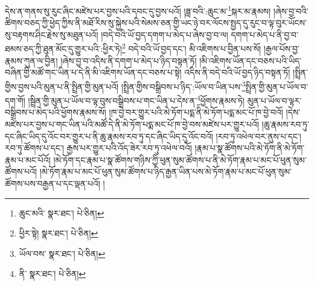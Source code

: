 དེས་ན་གནས་སུ་རུང་ཞིང་མཛེས་པར་བྱས་པའི་དབང་དུ་བྱས་པའོ། །ཟླ་བའི་:ཆུང་མ་\footnote{ཆུང་མའི་  སྣར་ཐང་།  པེ་ཅིན། }སྐར་མ་རྣམས། །ཞེས་བྱ་བའི་ཚིགས་བཅད་ཀྱི་ཕྱེད་ཀྱིས་ནི་མཐོ་རིས་སུ་སྐྱེས་པའི་སེམས་ཅན་གྱི་ཡང་ཉེ་བར་ལོངས་སྤྱད་དུ་རུང་བ་ལྟ་བུར་ཡོངས་སུ་བརྟགས་ཤིང་རྗེས་སུ་མཐུན་པའོ། །བདེ་བའི་ཡོ་བྱད་དགག་པ་མེད་པ་ཞེས་བྱ་བ་ལ། དགག་པ་མེད་པ་ནི་བྱ་བ་ཐམས་ཅད་ཀྱི་ཐུན་མོང་དུ་གྱུར་པའི་:ཕྱིར་ཏེ།\footnote{ཕྱིར་སྟེ།  སྣར་ཐང་།  པེ་ཅིན། } བདེ་བའི་ཡོ་བྱད་དང་། མི་འཇིགས་པ་བྱིན་པས་སོ། །རྒྱལ་པོས་བྱ་རྣམས་ཀུན་ལ་བྱིན། །ཞེས་བྱ་བ་འདིས་ནི་དགག་པ་མེད་པ་ཉིད་བསྟན་ཏོ། །མི་འཇིགས་ཡོན་དང་བཅས་པའི་ཡིད་བཞིན་གྱི་མཚོ་གང་ཡིན་པ་དེ་ནི་མི་འཇིགས་ཡོན་དང་བཅས་པ་སྟེ། འདིས་ནི་བདེ་བའི་ཡོ་བྱད་ཉིད་བསྟན་ཏོ། །སྤྲིན་གྱིས་བྱས་པའི་མུན་པ་ནི་སྤྲིན་གྱི་མུན་པའོ། །སྤྲིན་གྱིས་བསྒྲིབས་པ་ཉིད་:ཡོལ་བ་ཡིན་པས་\footnote{ཡོལ་བས་  སྣར་ཐང་།  པེ་ཅིན། }སྤྲིན་གྱི་མུན་པ་ཡོལ་བ་དག་གོ། །སྦྲིན་གྱི་མུན་པ་ཡོལ་བ་ལྟ་བུས་བསྒྲིབས་པ་གང་ཡིན་པ་དེས་ན་\footnote{ནི་  སྣར་ཐང་།  པེ་ཅིན། }ཕྱོགས་རྣམས་ཏེ། མུན་པ་ཡོལ་བ་ལྟར་བསྒྲིབས་པ་མེད་པའི་ཕྱོགས་རྣམས་སོ། །ཁ་བྱེ་བར་གྱུར་པའི་མེ་ཏོག་པདྨ་ནི་མེ་ཏོག་པདྨ་མང་པོ་ཁ་བྱེ་བའོ། །དེས་མཛེས་པར་བྱས་པ་གང་ཡིན་པའི་མཚོ་དེ་ནི་མེ་ཏོག་པདྨ་མང་པོ་ཁ་བྱེ་བས་མཛེས་པར་གྱུར་པའོ། །ཆུ་རྣམས་རབ་ཏུ་དང་ཞིང་ཡིད་དུ་འོང་བར་གྱུར་པ་ནི་ཆུ་རྣམས་རབ་ཏུ་དང་ཞིང་ཡིད་དུ་འོང་བའོ། །རབ་ཏུ་འཕེལ་བར་ནུས་པ་དང་། རབ་ཏུ་ཚོགས་པ་དང་། རྒྱས་པར་གྱུར་པའི་འོད་ཟེར་རབ་ཏུ་འཕེལ་བའོ། །རྣམ་པ་སྣ་ཚོགས་པའི་མེ་ཏོག་ནི་མེ་ཏོག་རྣམ་པ་མང་པོའོ། །མེ་ཏོག་དང་རྣམ་པ་སྣ་ཚོགས་གཉིས་ཀྱི་ཕུན་སུམ་ཚོགས་པ་ནི་མེ་ཏོག་རྣམ་པ་མང་པོ་ཕུན་སུམ་ཚོགས་པའོ། །མེ་ཏོག་རྣམ་པ་མང་པོ་ཕུན་སུམ་ཚོགས་པ་ཉིད་རྒྱན་ཡིན་པས་མེ་ཏོག་རྣམ་པ་མང་པོ་ཕུན་སུམ་ཚོགས་པས་བརྒྱན་པ་དང་ལྡན་པའོ། །
